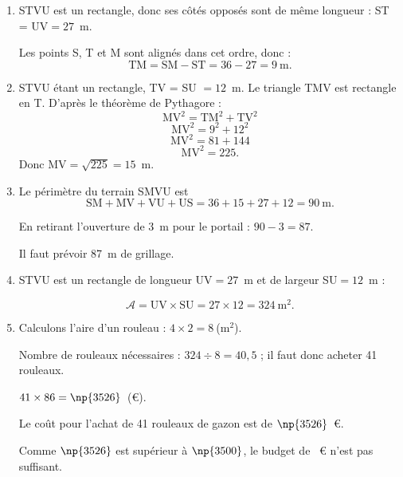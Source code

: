 \begin{enumerate}
	\item STVU est un rectangle, donc ses côtés opposés sont de même longueur : ST = UV$=27$~m.

	Les points S, T et M sont alignés dans cet ordre, donc :
	\[\text{TM}=\text{SM} - \text{ST} =36-27=9~\text{m}.\]

	\item STVU étant un rectangle, TV = SU $=12$~m. Le triangle TMV est rectangle en T. D'après le théorème de Pythagore :
	\[\text{MV}^{2}=\text{TM}^{2}+\text{TV}^{2} \]
	\[\text{MV}^{2}=9^{2}+12^{2}\]
	\[\text{MV}^{2}=81+144\]
	\[\text{MV}^{2}=225.\]
	Donc MV$ = \sqrt{225}=15$~m.

	\item Le périmètre du terrain SMVU est
\[\text{SM}+\text{MV}+\text{VU}+\text{US} = 36 + 15 + 27 + 12 = 90~\text{m}.\]
	
En retirant l'ouverture de 3~m pour le portail : $90-3=87$.

	Il faut prévoir 87~m de grillage.

	\item STVU est un rectangle de longueur UV$=27$~m et de largeur SU$=12$~m :

\[\mathcal{A}= \text{UV}\times \text{SU}=27\times 12 = 324~\text{m}^2.\]

	\item Calculons l'aire d'un rouleau : $4\times 2= 8~$(m$^2$).

	Nombre de rouleaux nécessaires : $324\div 8=40,5$ ; il faut donc acheter 41 rouleaux.

	$41\times 86=\np{3526}$~(\euro).
	
Le coût pour l'achat de 41 rouleaux de gazon est de $\np{3526}$~\euro.

	Comme $\np{3526}$ est supérieur à $\np{3500}$, le budget de ~\euro{} n'est pas suffisant.
\end{enumerate}
